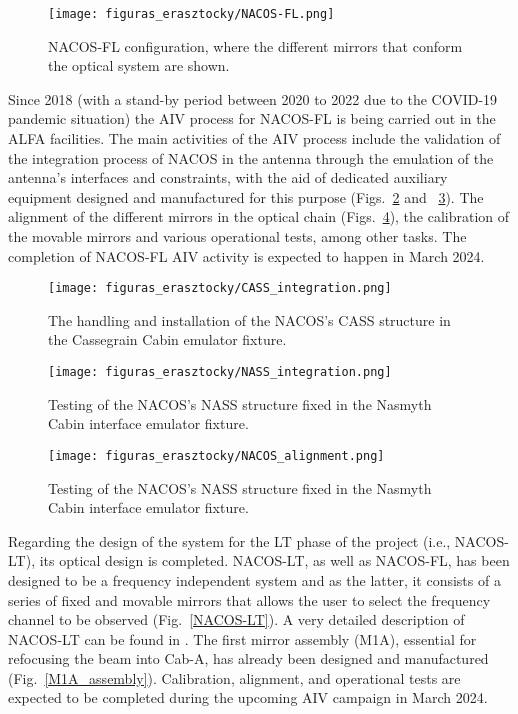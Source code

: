 \documentclass[baaa]{baaa}
\begin{document}
\begin{figure}[!t]
\centering
\texttt{[image: figuras\_erasztocky/NACOS-FL.png]}
\caption{NACOS-FL configuration, where the different mirrors that conform the optical system are shown.}
\label{NACOS-FL}
\end{figure}

Since 2018 (with a stand-by period between 2020 to 2022 due to the COVID-19 pandemic situation) the AIV process for NACOS-FL is being carried out in the ALFA facilities. The main activities of the AIV process include the validation of the integration process of NACOS in the antenna through the emulation of the antenna's interfaces and constraints, with the aid of dedicated auxiliary equipment designed and manufactured for this purpose (Figs.~\ref{CASS_integration} and ~\ref{NASS_integration}). The alignment of the different mirrors in the optical chain (Figs.~\ref{NACOS_alignment}), the calibration of the movable mirrors and various operational tests, among other tasks. The completion of NACOS-FL AIV activity is expected to happen in March 2024.     


\begin{figure}[!t]
\centering
\texttt{[image: figuras\_erasztocky/CASS\_integration.png]}
\caption{The handling and installation of the NACOS's CASS structure in the Cassegrain Cabin emulator fixture.}
\label{CASS_integration}
\end{figure}

\begin{figure}[!t]
\centering
\texttt{[image: figuras\_erasztocky/NASS\_integration.png]}
\caption{Testing of the NACOS's NASS structure fixed in the Nasmyth Cabin interface emulator fixture.}
\label{NASS_integration}
\end{figure}

\begin{figure}[!t]
\centering
\texttt{[image: figuras\_erasztocky/NACOS\_alignment.png]}
\caption{Testing of the NACOS's NASS structure fixed in the Nasmyth Cabin interface emulator fixture.}
\label{NACOS_alignment}
\end{figure}

Regarding the design of the system for the LT phase of the project (i.e., NACOS-LT), its optical design is completed. NACOS-LT, as well as NACOS-FL, has been designed to be a frequency independent system and as the latter, it consists of a series of fixed and movable mirrors that allows the user to select the frequency channel to be observed (Fig.~\ref{NACOS-LT}). A very detailed description of NACOS-LT can be found in  \citep{rasztocky2024b}.
The first mirror assembly (M1A), essential for refocusing the beam into Cab-A, has already been designed and manufactured (Fig.~\ref{M1A_assembly}). Calibration, alignment, and operational tests are expected to be completed during the upcoming AIV campaign in March 2024.
\end{document}
